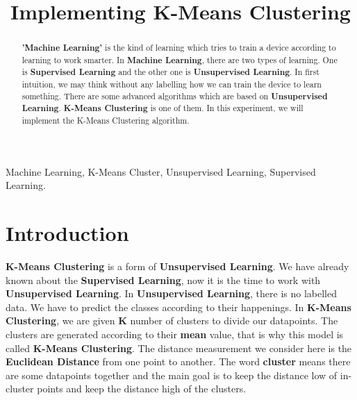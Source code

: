 \documentclass[conference]{IEEEtran}
\begin{document}
\title{Implementing K-Means Clustering\\
}

\author{

}

\maketitle

\begin{abstract}
 \textbf{'Machine Learning'} is the kind of learning which tries to train a device according to learning to work smarter. In \textbf{Machine Learning}, there are two types of learning. One is \textbf{Supervised Learning} and the other one is \textbf{Unsupervised Learning}. In first intuition, we may think without any labelling how we can train the device to learn something. There are some advanced algorithms which are based on \textbf{Unsupervised Learning}. \textbf{K-Means Clustering} is one of them. In this experiment, we will implement the K-Means Clustering algorithm.
\end{abstract}

\begin{IEEEkeywords}
Machine Learning, K-Means Cluster, Unsupervised Learning, Supervised Learning.
\end{IEEEkeywords}

\section{Introduction}
\textbf{K-Means Clustering} is a form of \textbf{Unsupervised Learning}. We have already known about the \textbf{Supervised Learning}, now it is the time to work with \textbf{Unsupervised Learning}. In \textbf{Unsupervised Learning}, there is no labelled data. We have to predict the classes according to their happenings. In \textbf{K-Means Clustering}, we are given \textbf{K}  number of clusters to divide our datapoints. The clusters are generated according to their \textbf{mean} value, that is why this model is called \textbf{K-Means Clustering}. The distance measurement we consider here is the \textbf{Euclidean Distance} from one point to another. The word \textbf{cluster} means there are some datapoints together and the main goal is to keep the distance low of in-cluster points and keep the distance high of the clusters.
\end{document}
